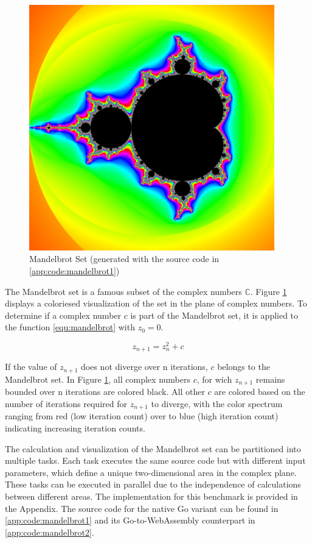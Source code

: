 \begin{figure}[htbp]
  \centering
  \includegraphics[width=0.95\textwidth]{gfx/figures/mandelbrot.png}
  \caption{Mandelbrot Set (generated with the source code in \ref{app:code:mandelbrot1})}
  \label{fig:methodology:mandelbrot}
\end{figure}

The Mandelbrot set is a famous subset of the complex numbers $\mathbb{C}$. Figure \ref{fig:methodology:mandelbrot} displays a coloriesed visualization of the set in the plane of complex numbers. To determine if a complex number $c$ is part of the Mandelbrot set, it is applied to the function \ref{equ:mandelbrot} with $z_{0}=0$.

\begin{equation}
  z_{n+1} = z_{n}^2 + c
  \label{equ:mandelbrot}
\end{equation}

If the value of $z_{n+1}$ does not diverge over n iterations, $c$ belongs to the Mandelbrot set. In Figure \ref{fig:methodology:mandelbrot}, all complex numbers $c$, for wich $z_{n+1}$ remains bounded over n iterations are colored black. All other $c$ are colored based on the number of iterations required for $z_{n+1}$ to diverge, with the color spectrum ranging from red (low iteration count) over to blue (high iteration count) indicating increasing iteration counts.

The calculation and visualization of the Mandelbrot set can be partitioned into multiple tasks. Each task executes the same source code but with different input parameters, which define a unique two-dimensional area in the complex plane. These tasks can be executed in parallel due to the independence of calculations between different areas. The implementation for this benchmark is provided in the Appendix. The source code for the native Go variant can be found in \ref{app:code:mandelbrot1} and its Go-to-WebAssembly counterpart in \ref{app:code:mandelbrot2}.